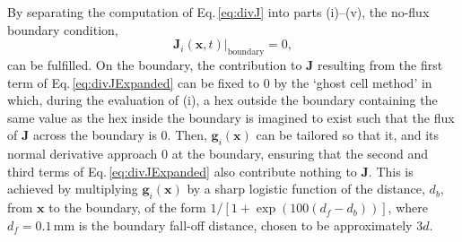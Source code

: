\documentclass[9pt,lineno]{elife}
\newcommand{\MPtwo}[1]{\textcolor{colmptwo}{#1}}
\newcommand{\mb}[1]{\mathbf{#1}}
\begin{document}
By separating the computation of Eq.\,\ref{eq:divJ} into parts (i)--(v), the
no-flux boundary condition,
%
\begin{equation}
  \label{eq:noflux}
  \mb{J}_i(\mb{x},t)\big\rvert_{\mathrm{boundary}} = 0,
\end{equation}
%
can be fulfilled. On
the boundary, the contribution to $\mb{J}$ resulting from the first term of
Eq.\,\ref{eq:divJExpanded} can be fixed to 0 by the `ghost cell method' in
which, during the evaluation of (i), a hex outside the boundary containing the
same value as the hex inside the boundary is imagined to exist such that the
flux of $\mb{J}$ across the boundary is 0. Then, $\mb{g}_i(\mb{x})$ can be
tailored so that it, and its normal derivative approach 0 at the boundary,
ensuring that the second and third terms of Eq.\,\ref{eq:divJExpanded} also
contribute nothing to $\mb{J}$. This is achieved by \MPtwo{multiplying}
$\mb{g}_i(\mb{x})$ \MPtwo{by} a sharp logistic function of the distance, $d_b$,
from $\mb{x}$ to the boundary, \MPtwo{of the form $1/[1 +
  \exp(100(d_f-d_b))]$, where $d_f=0.1$\,mm is the boundary fall-off distance,
  chosen to be approximately $3d$}.
\end{document}
